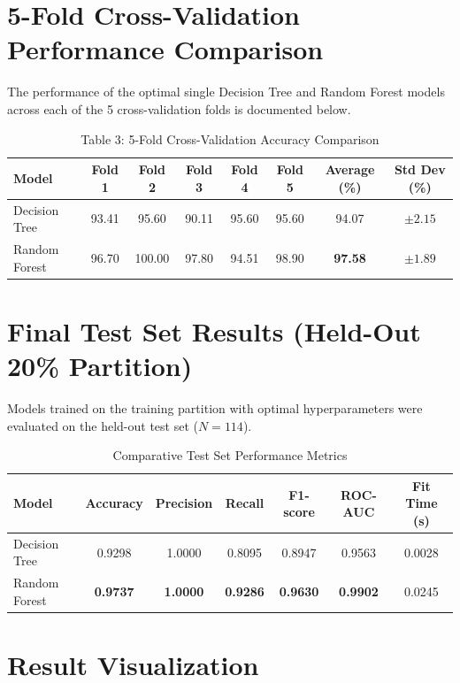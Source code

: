 \documentclass[12pt,a4paper]{article}
\begin{document}
\section{5-Fold Cross-Validation Performance Comparison}
The performance of the optimal single Decision Tree and Random Forest models across each of the 5 cross-validation folds is documented below.

\begin{table}[H]
\centering
\begin{tabular}{lccccccc}
\toprule
\textbf{Model} & \textbf{Fold 1} & \textbf{Fold 2} & \textbf{Fold 3} & \textbf{Fold 4} & \textbf{Fold 5} & \textbf{Average (\%)} & \textbf{Std Dev (\%)} \\
\midrule
Decision Tree & 93.41 & 95.60 & 90.11 & 95.60 & 95.60 & 94.07 & $\pm 2.15$ \\
Random Forest & 96.70 & 100.00 & 97.80 & 94.51 & 98.90 & \textbf{97.58} & $\mathbf{\pm 1.89}$ \\
\bottomrule
\end{tabular}
\caption{Table 3: 5-Fold Cross-Validation Accuracy Comparison}
\end{table}

\section{Final Test Set Results (Held-Out 20\% Partition)}
Models trained on the training partition with optimal hyperparameters were evaluated on the held-out test set ($N=114$).

\begin{table}[H]
\centering
\begin{tabular}{lcccccc}
\toprule
\textbf{Model} & \textbf{Accuracy} & \textbf{Precision} & \textbf{Recall} & \textbf{F1-score} & \textbf{ROC-AUC} & \textbf{Fit Time (s)} \\
\midrule
Decision Tree & 0.9298 & 1.0000 & 0.8095 & 0.8947 & 0.9563 & 0.0028 \\
Random Forest & \textbf{0.9737} & \textbf{1.0000} & \textbf{0.9286} & \textbf{0.9630} & \textbf{0.9902} & 0.0245 \\
\bottomrule
\end{tabular}
\caption{Comparative Test Set Performance Metrics}
\end{table}

\section{Result Visualization}
\end{document}
